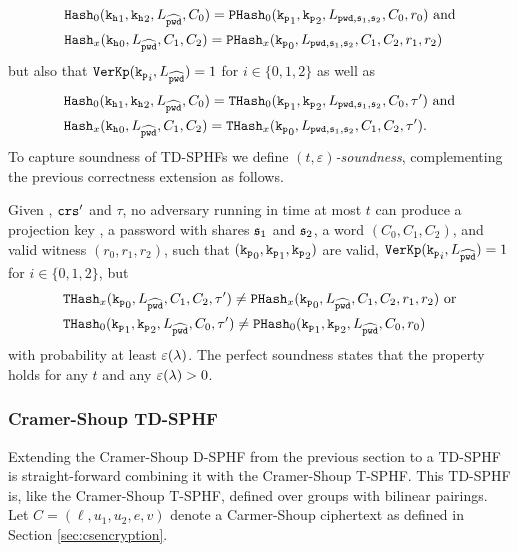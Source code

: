 \begin{align*}  
&\mathtt{Hash}_0(\mathtt{k_h}_1, \mathtt{k_h}_2, L_{\widehat{\mathtt{pwd}}}, C_0)=\mathtt{PHash}_0(\mathtt{k_p}_1, \mathtt{k_p}_2, L_{\mathtt{pwd}, \mathfrak{s}_1, \mathfrak{s}_2}, C_0, r_0) \text{ and} \\
&\mathtt{Hash}_x(\mathtt{k_h}_0, L_{\widehat{\mathtt{pwd}}}, C_1, C_2)=\mathtt{PHash}_x(\mathtt{k_p}_0, L_{\mathtt{pwd}, \mathfrak{s}_1, \mathfrak{s}_2}, C_1, C_2, r_1, r_2)
\end{align*}
but also that $\mathtt{VerKp}(\mathtt{k_p}_i, L_{\widehat{\mathtt{pwd}}})=1$ for $i\in\{0,1,2\}$ as well as 
\begin{align*}
&\mathtt{Hash}_0(\mathtt{k_h}_1, \mathtt{k_h}_2, L_{\widehat{\mathtt{pwd}}}, C_0)=\mathtt{THash}_0(\mathtt{k_p}_1, \mathtt{k_p}_2, L_{\mathtt{pwd}, \mathfrak{s}_1, \mathfrak{s}_2}, C_0, \tau') \text{ and} \\
&\mathtt{Hash}_x(\mathtt{k_h}_0, L_{\widehat{\mathtt{pwd}}}, C_1, C_2)=\mathtt{THash}_x(\mathtt{k_p}_0, L_{\mathtt{pwd}, \mathfrak{s}_1, \mathfrak{s}_2}, C_1, C_2, \tau').
\end{align*}
To capture soundness of TD-SPHFs we define \emph{$(t,\varepsilon)$-soundness}, complementing the previous correctness extension as follows.

\begin{definition}\label{def:tdsphf-soundness}
Given \crs, $\mathtt{crs}'$ and $\tau$, no adversary running in time at most $t$ can produce a projection key \hp, a password \pwd with shares $\mathfrak{s}_1$ and $\mathfrak{s}_2$, a word $(C_0,C_1,C_2)$, and valid witness $(r_0,r_1,r_2)$, such that $(\mathtt{k_p}_0,\mathtt{k_p}_1,\mathtt{k_p}_2)$ are valid, \ie $\mathtt{VerKp}(\mathtt{k_p}_i,L_{\widehat{\mathtt{pwd}}})=1$ for $i\in\{0,1,2\}$, but 
\begin{align*}
&\mathtt{THash}_x(\mathtt{k_p}_0,L_{\widehat{\mathtt{pwd}}},C_1, C_2, \tau')\not=\mathtt{PHash}_x(\mathtt{k_p}_0,L_{\widehat{\mathtt{pwd}}}, C_1, C_2, r_1, r_2) \text{ or} \\
&\mathtt{THash}_0(\mathtt{k_p}_1, \mathtt{k_p}_2, L_{\widehat{\mathtt{pwd}}}, C_0, \tau')\not=\mathtt{PHash}_0(\mathtt{k_p}_1, \mathtt{k_p}_2, L_{\widehat{\mathtt{pwd}}}, C_0, r_0)
\end{align*}
with probability at least $\varepsilon(\lambda)$.
The perfect soundness states that the property holds for any $t$ and any $\varepsilon(\lambda)>0$.
\end{definition} 

\subsubsection{Cramer-Shoup TD-SPHF}\label{sec:cs-tdsphf}
Extending the Cramer-Shoup \ac{D-SPHF} from the previous section to a \ac{TD-SPHF} is straight-forward combining it with the Cramer-Shoup \ac{T-SPHF}.
This \ac{TD-SPHF} is, like the Cramer-Shoup \ac{T-SPHF}, defined over groups with bilinear pairings.
Let $C=(\ell, u_1, u_2, e, v)$ denote a Carmer-Shoup ciphertext as defined in Section \ref{sec:csencryption}.

